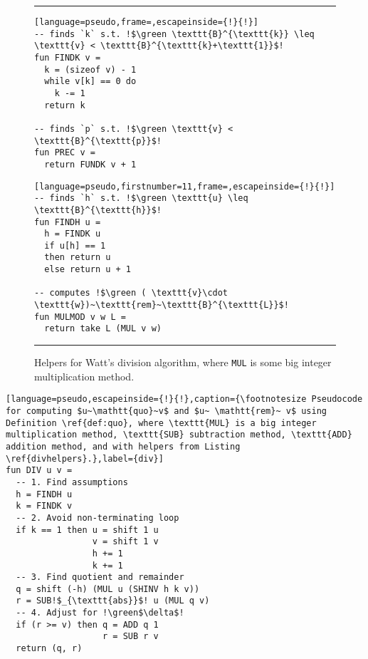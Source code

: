 \begin{figure}
{
\hrule\vspace*{-0.4ex}
\begin{minipage}{.45\textwidth}
\begin{lstlisting}[language=pseudo,frame=,escapeinside={!}{!}]
-- finds `k` s.t. !$\green \texttt{B}^{\texttt{k}} \leq \texttt{v} < \texttt{B}^{\texttt{k}+\texttt{1}}$!
fun FINDK v =
  k = (sizeof v) - 1
  while v[k] == 0 do
    k -= 1
  return k

-- finds `p` s.t. !$\green \texttt{v} < \texttt{B}^{\texttt{p}}$!
fun PREC v =
  return FUNDK v + 1
\end{lstlisting}
\end{minipage}\hfill
\begin{minipage}{.45\textwidth}
\begin{lstlisting}[language=pseudo,firstnumber=11,frame=,escapeinside={!}{!}]
-- finds `h` s.t. !$\green \texttt{u} \leq \texttt{B}^{\texttt{h}}$!
fun FINDH u =
  h = FINDK u
  if u[h] == 1
  then return u
  else return u + 1

-- computes !$\green ( \texttt{v}\cdot \texttt{w})~\texttt{rem}~\texttt{B}^{\texttt{L}}$!
fun MULMOD v w L =
  return take L (MUL v w)
\end{lstlisting}
\end{minipage}\vspace*{-0.8ex}
\hrule
}
\caption{\footnotesize Helpers for Watt's division algorithm, where \texttt{MUL}
  is some big integer multiplication method.}
\label{divhelpers}
\end{figure}

\begin{lstlisting}[language=pseudo,escapeinside={!}{!},caption={\footnotesize Pseudocode for computing $u~\mathtt{quo}~v$ and $u~ \mathtt{rem}~ v$ using Definition \ref{def:quo}, where \texttt{MUL} is a big integer multiplication method, \texttt{SUB} subtraction method, \texttt{ADD} addition method, and with helpers from Listing \ref{divhelpers}.},label={div}]
fun DIV u v =
  -- 1. Find assumptions
  h = FINDH u
  k = FINDK v
  -- 2. Avoid non-terminating loop
  if k == 1 then u = shift 1 u
                 v = shift 1 v
                 h += 1
                 k += 1
  -- 3. Find quotient and remainder
  q = shift (-h) (MUL u (SHINV h k v))
  r = SUB!$_{\texttt{abs}}$! u (MUL q v)
  -- 4. Adjust for !\green$\delta$!
  if (r >= v) then q = ADD q 1
                   r = SUB r v
  return (q, r)
\end{lstlisting}

